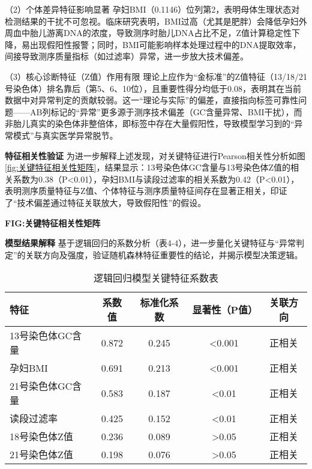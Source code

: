 \documentclass[withoutpreface,bwprint]{cumcmthesis} %
\begin{document}
（2）个体差异特征影响显著
孕妇BMI（0.1146）位列第2，表明母体生理状态对检测结果的干扰不可忽视。临床研究表明，BMI过高（尤其是肥胖）会降低孕妇外周血中胎儿游离DNA的浓度，导致测序时胎儿DNA占比不足，Z值计算稳定性下降，易出现假阳性报警；同时，BMI可能影响样本处理过程中的DNA提取效率，间接导致测序质量指标（如过滤率）异常，进一步放大技术偏差。

（3）核心诊断特征（Z值）作用有限
理论上应作为“金标准”的Z值特征（13/18/21号染色体）排名靠后（第5、6、10位），且重要性得分均低于0.08，表明其在当前数据中对异常判定的贡献较弱。这一“理论与实际”的偏差，直接指向标签可靠性问题——AB列标记的“异常”更多源于测序技术偏差（GC含量异常、BMI干扰），而非胎儿真实的染色体非整倍体，即标签中存在大量假阳性，导致模型学习到的“异常模式”与真实医学异常脱节。


\textbf{特征相关性验证}
为进一步解释上述发现，对关键特征进行Pearson相关性分析如图\ref{fig:关键特征相关性矩阵}，结果显示：13号染色体GC含量与13号染色体Z值的相关系数为0.38（P<0.01），孕妇BMI与读段过滤率的相关系数为0.42（P<0.01），表明测序质量特征与Z值、个体特征与测序质量特征间存在显著正相关，印证了“技术偏差通过特征关联放大，导致假阳性”的假设。

\textbf{FIG:关键特征相关性矩阵}

\textbf{模型结果解释}
基于逻辑回归的系数分析（表4-4），进一步量化关键特征与“异常判定”的关联方向及强度，验证随机森林特征重要性的结论，并揭示模型决策逻辑。


\begin{table}[H]
    \centering  %
    \caption{逻辑回归模型关键特征系数表}  %
    \label{tab:逻辑回归模型关键特征系数表}  %
    \begin{threeparttable}
        \begin{tabularx}{0.88\textwidth}{l c c c c}
            \toprule[1.5pt]
            \textbf{特征} & \textbf{系数值} & \textbf{标准化系数} & \textbf{显著性（P值）} & \textbf{关联方向} \\ 
            \midrule[1pt]
            13号染色体GC含量    & 0.872    & 0.245      & <0.001        & 正相关   \\
            孕妇BMI             & 0.691    & 0.213      & <0.001        & 正相关   \\
            21号染色体GC含量    & 0.583    & 0.187      & <0.01         & 正相关   \\
            读段过滤率          & 0.425    & 0.152      & <0.01         & 正相关   \\
            18号染色体Z值       & 0.236    & 0.089      & >0.05         & 正相关   \\
            21号染色体Z值       & 0.198    & 0.076      & >0.05         & 正相关   \\

            \bottomrule[1.5pt]
        \end{tabularx}
    \end{threeparttable}
\end{table}
\end{document}
